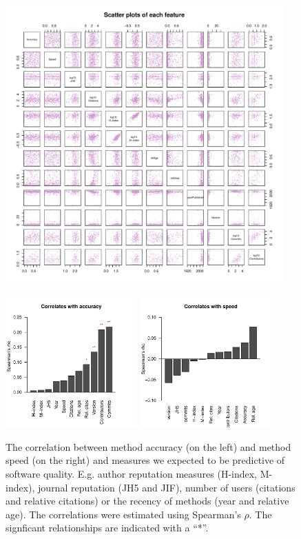 \documentclass[fleqn,10pt]{SelfArx} %
\begin{document}
\begin{figure}[H]
\centering
\includegraphics[width=0.95\textwidth]{supplementary-figures-pairs.pdf}
\caption{}
\label{fig:metricPairs}
\end{figure}


\begin{figure}[H]
\centering
\includegraphics[width=0.45\textwidth]{spearmanBarplot.pdf}
\includegraphics[width=0.45\textwidth]{spearmanBarplotSpeed.pdf}
\caption{The correlation between method accuracy (on the left) and
  method speed (on the right) and measures we expected to be
  predictive of software quality. E.g. author reputation measures
  (H-index, M-index), journal reputation (JH5 and JIF), number of
  users (citations and relative citations) or the recency of methods
  (year and relative age).  The correlations were estimated using
  Spearman's $\rho$. The signficant relationships are indicated with a
  ``*''. }
\label{fig:S2}
\end{figure}
\end{document}
